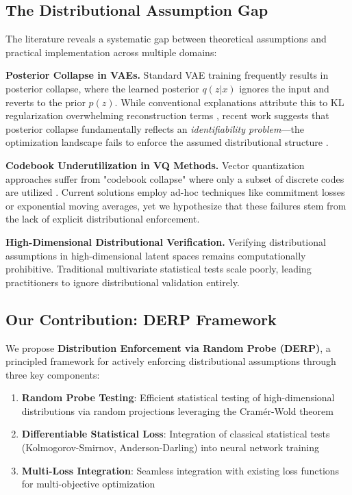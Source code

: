 \documentclass{article}
\begin{document}
\subsection{The Distributional Assumption Gap}

The literature reveals a systematic gap between theoretical assumptions and practical implementation across multiple domains:

\textbf{Posterior Collapse in VAEs.} Standard VAE training frequently results in posterior collapse, where the learned posterior $q(z|x)$ ignores the input and reverts to the prior $p(z)$. While conventional explanations attribute this to KL regularization overwhelming reconstruction terms \citep{bowman2015generating}, recent work suggests that posterior collapse fundamentally reflects an \emph{identifiability problem}—the optimization landscape fails to enforce the assumed distributional structure \citep{lucas2019don, wang2023posterior}.

\textbf{Codebook Underutilization in VQ Methods.} Vector quantization approaches suffer from "codebook collapse" where only a subset of discrete codes are utilized \citep{van2017neural}. Current solutions employ ad-hoc techniques like commitment losses or exponential moving averages, yet we hypothesize that these failures stem from the lack of explicit distributional enforcement.

\textbf{High-Dimensional Distributional Verification.} Verifying distributional assumptions in high-dimensional latent spaces remains computationally prohibitive. Traditional multivariate statistical tests scale poorly, leading practitioners to ignore distributional validation entirely.

\subsection{Our Contribution: DERP Framework}

We propose \textbf{Distribution Enforcement via Random Probe (DERP)}, a principled framework for actively enforcing distributional assumptions through three key components:

\begin{enumerate}
\item \textbf{Random Probe Testing}: Efficient statistical testing of high-dimensional distributions via random projections leveraging the Cramér-Wold theorem
\item \textbf{Differentiable Statistical Loss}: Integration of classical statistical tests (Kolmogorov-Smirnov, Anderson-Darling) into neural network training
\item \textbf{Multi-Loss Integration}: Seamless integration with existing loss functions for multi-objective optimization
\end{enumerate}
\end{document}

